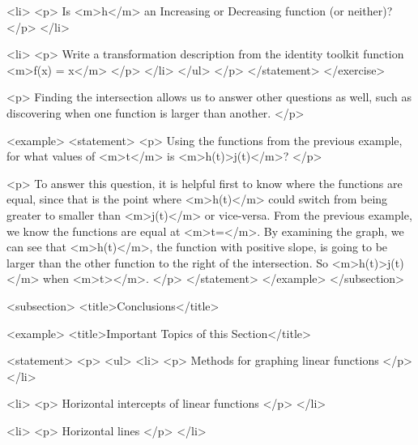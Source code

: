                         <li>
                            <p>
                                Is <m>h</m> an Increasing or Decreasing function (or neither)?
                            </p>
                        </li>

                        <li>
                            <p>
                                Write a transformation description from the identity toolkit function <m>f(x) = x</m>
                            </p>
                        </li>
                    </ul>
                </p>
            </statement>
        </exercise>

        <p>
            Finding the intersection allows us to answer other questions as well, such as discovering when one function is larger than another.
        </p>

        <example>
            <statement>
                <p>
                    Using the functions from the previous example, for what values of <m>t</m> is <m>h(t)>j(t)</m>?
                </p>

                <p>
                    To answer this question, it is helpful first to know where the functions are equal, since that is the point where <m>h(t)</m> could switch from being greater to smaller than <m>j(t)</m> or vice-versa.
                    From the previous example, we know the functions are equal at <m>t=</m>.
                    By examining the graph, we can see that <m>h(t)</m>, the function with positive slope, is going to be larger than the other function to the right of the intersection.
                    So <m>h(t)>j(t)</m> when <m>t></m>.
                </p>
            </statement>
        </example>
    </subsection>


    <subsection>
        <title>Conclusions</title>

        <example>
            <title>Important Topics of this Section</title>

            <statement>
                <p>
                    <ul>
                        <li>
                            <p>
                                Methods for graphing linear functions
                            </p>
                        </li>

                        <li>
                            <p>
                                Horizontal intercepts of linear functions
                            </p>
                        </li>

                        <li>
                            <p>
                                Horizontal lines
                            </p>
                        </li>

